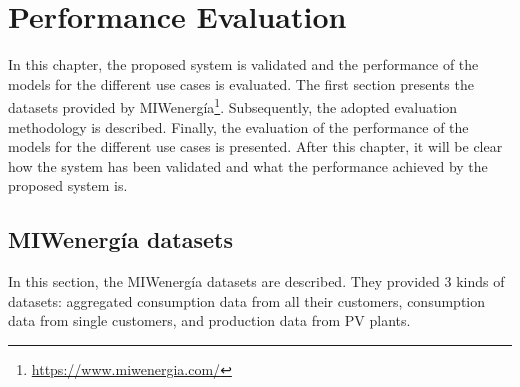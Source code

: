 \chapter{Performance Evaluation}
\label{cha:evaluation}
\vspace{0.4 cm}

In this chapter, the proposed system is validated and the performance of the models for the different use cases is evaluated.
The first section presents the datasets provided by MIWenergía\footnote{ \url{https://www.miwenergia.com/} }.
Subsequently, the adopted evaluation methodology is described.
Finally, the evaluation of the performance of the models for the different use cases is presented.
After this chapter, it will be clear how the system has been validated and what the performance achieved by the proposed system is.


\section{MIWenergía datasets}
\label{sec:datasets}
\vspace{0.2 cm}

In this section, the MIWenergía datasets are described.
They provided 3 kinds of datasets: aggregated consumption data from all their customers, consumption data from single customers, and production data from PV plants.

